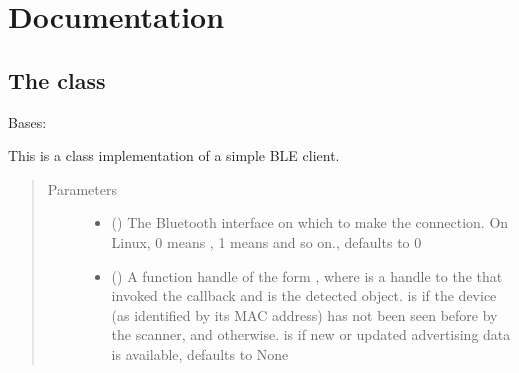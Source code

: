 \documentclass[letterpaper,10pt,english]{sphinxmanual}
\begin{document}
\chapter{Documentation}
\label{\detokenize{PandaBot:documentation}}\label{\detokenize{PandaBot::doc}}

\section{The  class}
\label{\detokenize{PandaBot:the-PandaBotclient-class}}

\begin{fulllineitems}
\label{\detokenize{PandaBot:PandaBot.PandaBotClient}}
Bases: 

This is a class implementation of a simple BLE client.
\begin{quote}\begin{description}
\item[{Parameters}] \leavevmode\begin{itemize}
\item {} 
 (\sphinxstyleliteralemphasis{\sphinxupquote{, }}) \textendash{} The Bluetooth interface on which to make the connection. On Linux, 0 means , 1 means  and so on., defaults to 0

\item {} 
 (\sphinxstyleliteralemphasis{\sphinxupquote{, }}) \textendash{} A function handle of the form , where  is a handle to the {\hyperref[\detokenize{PandaBot:PandaBot.PandaBotClient}]{}} that invoked the callback and  is the detected {\hyperref[\detokenize{PandaBot:PandaBot.PandaBotDevice}]{}} object.  is  if the device (as identified by its MAC address) has not been seen before by the scanner, and  otherwise.  is  if new or updated advertising data is available, defaults to None


\end{itemize}
\end{description}
\end{quote}
\end{fulllineitems}
\end{document}
